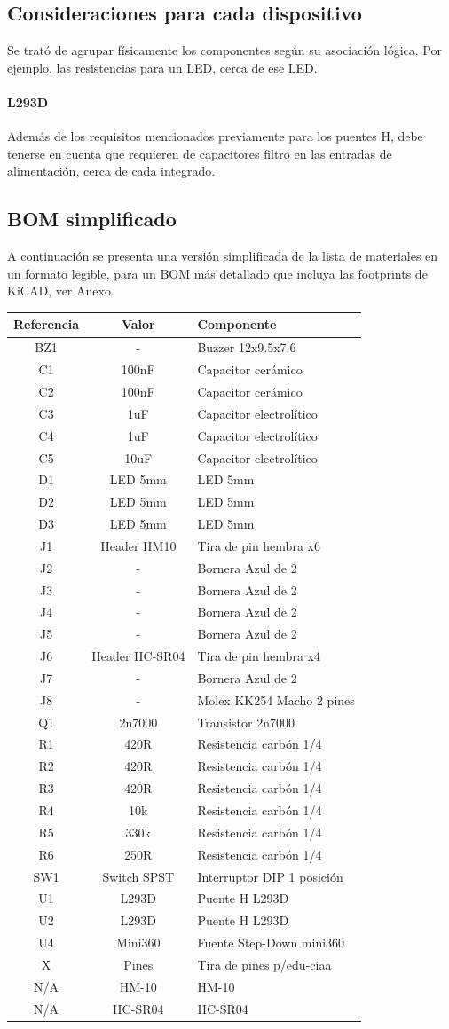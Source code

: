 \subsection{Consideraciones para cada dispositivo}

Se trató de agrupar físicamente los componentes según su asociación lógica. Por ejemplo, las resistencias para un LED, cerca de ese LED.

\paragraph{L293D} Además de los requisitos mencionados previamente para los puentes H, debe tenerse en cuenta que requieren de capacitores filtro en las entradas de alimentación, cerca de cada integrado.

\subsection{BOM simplificado}

A continuación se presenta una versión simplificada de la lista de materiales en un formato legible, para un BOM más detallado que incluya las footprints de KiCAD, ver Anexo.


\begin{longtable}[]{|c|c|p{7cm}|}
	\toprule
	Referencia & Valor & Componente \tabularnewline
	\midrule
	\endhead
	
	BZ1 & - & Buzzer 12x9.5x7.6\tabularnewline
	C1 & 100nF & Capacitor cerámico\tabularnewline
	C2 & 100nF & Capacitor cerámico\tabularnewline
	C3 & 1uF & Capacitor electrolítico\tabularnewline
	C4 & 1uF & Capacitor electrolítico\tabularnewline
	C5 & 10uF & Capacitor electrolítico\tabularnewline
	D1 & LED 5mm & LED 5mm\tabularnewline
	D2 & LED 5mm & LED 5mm\tabularnewline
	D3 & LED 5mm & LED 5mm\tabularnewline
	J1 & Header HM10 & Tira de pin hembra x6\tabularnewline
	J2 & - & Bornera Azul de 2\tabularnewline
	J3 & - & Bornera Azul de 2\tabularnewline
	J4 & - & Bornera Azul de 2\tabularnewline
	J5 & - & Bornera Azul de 2\tabularnewline
	J6 & Header HC-SR04 & Tira de pin hembra x4\tabularnewline
	J7 & - & Bornera Azul de 2\tabularnewline
	J8 & - & Molex KK254 Macho 2 pines\tabularnewline
	Q1 & 2n7000 & Transistor 2n7000\tabularnewline
	R1 & 420R & Resistencia carbón 1/4\tabularnewline
	R2 & 420R & Resistencia carbón 1/4\tabularnewline
	R3 & 420R & Resistencia carbón 1/4\tabularnewline
	R4 & 10k & Resistencia carbón 1/4\tabularnewline
	R5 & 330k & Resistencia carbón 1/4\tabularnewline
	R6 & 250R & Resistencia carbón 1/4\tabularnewline
	SW1 & Switch SPST & Interruptor DIP 1 posición\tabularnewline
	U1 & L293D & Puente H L293D\tabularnewline
	U2 & L293D & Puente H L293D\tabularnewline
	U4 & Mini360 & Fuente Step-Down mini360\tabularnewline
	X & Pines & Tira de pines p/edu-ciaa\tabularnewline
	N/A & HM-10 & HM-10\tabularnewline
	N/A & HC-SR04 & HC-SR04\tabularnewline	
	
	\bottomrule
\end{longtable}
